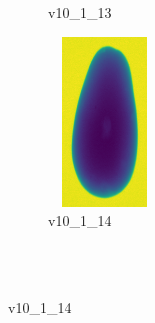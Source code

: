 \documentclass[11pt]{article}
\begin{document}
\begin{figure}
\begin{subfigure}[b]{0.15\textwidth}
        \caption{v10\_1\_13}
         \label{fig:five over x}
     \end{subfigure}
     \hfill
    \begin{subfigure}[b]{0.15\textwidth}
         \centering
         \includegraphics[width=3cm, height=4.5cm]{images/kartofler/v10_1_14_cut.png}
        \caption{v10\_1\_14}
         \label{fig:five over x}
     \end{subfigure}
     
     
     \\ \\
     

\end{figure}
\end{document}
